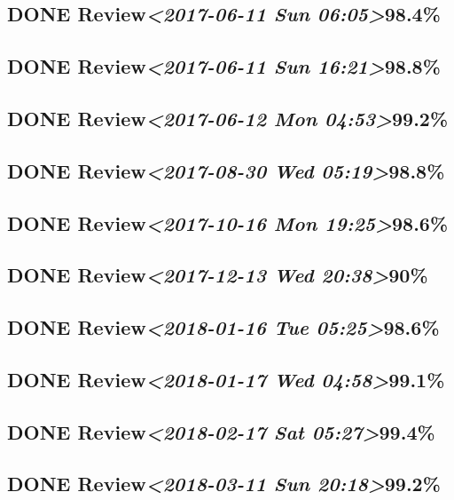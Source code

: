 \documentclass[11pt]{ctexart}
\begin{document}
\subsection{{\bfseries\sffamily DONE} Review\textit{<2017-06-11 Sun 06:05>}98.4\%}
\label{sec:orgf9190f9}
\subsection{{\bfseries\sffamily DONE} Review\textit{<2017-06-11 Sun 16:21>}98.8\%}
\label{sec:orgb973f6b}
\subsection{{\bfseries\sffamily DONE} Review\textit{<2017-06-12 Mon 04:53>}99.2\%}
\label{sec:org500f26e}

\subsection{{\bfseries\sffamily DONE} Review\textit{<2017-08-30 Wed 05:19>}98.8\%}
\label{sec:org3a95d41}
\subsection{{\bfseries\sffamily DONE} Review\textit{<2017-10-16 Mon 19:25>}98.6\%}
\label{sec:org179290d}

\subsection{{\bfseries\sffamily DONE} Review\textit{<2017-12-13 Wed 20:38>}90\%}
\label{sec:org4070d1b}
\subsection{{\bfseries\sffamily DONE} Review\textit{<2018-01-16 Tue 05:25>}98.6\%}
\label{sec:org438acb1}
\subsection{{\bfseries\sffamily DONE} Review\textit{<2018-01-17 Wed 04:58>}99.1\%}
\label{sec:orgf70c326}
\subsection{{\bfseries\sffamily DONE} Review\textit{<2018-02-17 Sat 05:27>}99.4\%}
\label{sec:orgcecc322}
\subsection{{\bfseries\sffamily DONE} Review\textit{<2018-03-11 Sun 20:18>}99.2\%}
\label{sec:org03548eb}
\end{document}
